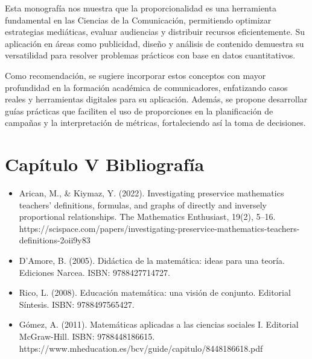 \documentclass[
  stu,
  floatsintext,
  longtable,
  a4paper,
  nolmodern,
  notxfonts,
  notimes,
  colorlinks=true,linkcolor=blue,citecolor=blue,urlcolor=blue]{apa7}
\begin{document}
Esta monografía nos muestra que la proporcionalidad es una herramienta
fundamental en las Ciencias de la Comunicación, permitiendo optimizar
estrategias mediáticas, evaluar audiencias y distribuir recursos
eficientemente. Su aplicación en áreas como publicidad, diseño y
análisis de contenido demuestra su versatilidad para resolver problemas
prácticos con base en datos cuantitativos.

Como recomendación, se sugiere incorporar estos conceptos con mayor
profundidad en la formación académica de comunicadores, enfatizando
casos reales y herramientas digitales para su aplicación. Además, se
propone desarrollar guías prácticas que faciliten el uso de proporciones
en la planificación de campañas y la interpretación de métricas,
fortaleciendo así la toma de decisiones.

\section{Capítulo V Bibliografía}\label{capuxedtulo-v-bibliografuxeda}

\begin{itemize}
\item
  Arican, M., \& Kiymaz, Y. (2022). Investigating preservice mathematics
  teachers' definitions, formulas, and graphs of directly and inversely
  proportional relationships. The Mathematics Enthusiast, 19(2), 5--16.
  https://scispace.com/papers/investigating-preservice-mathematics-teachers-definitions-2oii9y83
\item
  D'Amore, B. (2005). Didáctica de la matemática: ideas para una teoría.
  Ediciones Narcea. ISBN: 9788427714727.
\item
  Rico, L. (2008). Educación matemática: una visión de conjunto.
  Editorial Síntesis. ISBN: 9788497565427.
\item
  Gómez, A. (2011). Matemáticas aplicadas a las ciencias sociales I.
  Editorial McGraw-Hill. ISBN: 9788448186615.
  https://www.mheducation.es/bcv/guide/capitulo/8448186618.pdf
\end{itemize}
\end{document}
